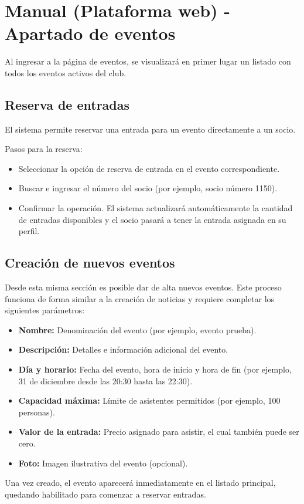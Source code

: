 \section{Manual (Plataforma web) - Apartado de eventos}

Al ingresar a la página de eventos, se visualizará en primer lugar un listado con todos los eventos activos del club.

\subsection{Reserva de entradas}
El sistema permite reservar una entrada para un evento directamente a un socio. 

Pasos para la reserva:
\begin{itemize}
    \item Seleccionar la opción de reserva de entrada en el evento correspondiente.
    \item Buscar e ingresar el número del socio (por ejemplo, socio número 1150).
    \item Confirmar la operación. El sistema actualizará automáticamente la cantidad de entradas disponibles y el socio pasará a tener la entrada asignada en su perfil.
\end{itemize}

\subsection{Creación de nuevos eventos}
Desde esta misma sección es posible dar de alta nuevos eventos. Este proceso funciona de forma similar a la creación de noticias y requiere completar los siguientes parámetros:

\begin{itemize}
    \item \textbf{Nombre:} Denominación del evento (por ejemplo, evento prueba).
    \item \textbf{Descripción:} Detalles e información adicional del evento.
    \item \textbf{Día y horario:} Fecha del evento, hora de inicio y hora de fin (por ejemplo, 31 de diciembre desde las 20:30 hasta las 22:30).
    \item \textbf{Capacidad máxima:} Límite de asistentes permitidos (por ejemplo, 100 personas).
    \item \textbf{Valor de la entrada:} Precio asignado para asistir, el cual también puede ser cero.
    \item \textbf{Foto:} Imagen ilustrativa del evento (opcional).
\end{itemize}

Una vez creado, el evento aparecerá inmediatamente en el listado principal, quedando habilitado para comenzar a reservar entradas.
